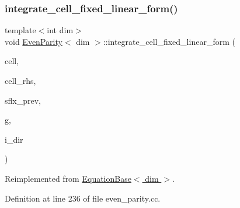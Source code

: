 \mbox{\label{class_even_parity_a5efaf943f1bde0b3f9a62ea8f5dc5ff0}} 
\subsubsection{\texorpdfstring{integrate\+\_\+cell\+\_\+fixed\+\_\+linear\+\_\+form()}{integrate\_cell\_fixed\_linear\_form()}}
{\footnotesize\ttfamily template$<$int dim$>$ \\
void \hyperlink{class_even_parity}{Even\+Parity}$<$ dim $>$\+::integrate\+\_\+cell\+\_\+fixed\+\_\+linear\+\_\+form (\begin{DoxyParamCaption}\item[{typename Do\+F\+Handler$<$ dim $>$\+::active\+\_\+cell\+\_\+iterator \&}]{cell,  }\item[{Vector$<$ double $>$ \&}]{cell\+\_\+rhs,  }\item[{std\+::vector$<$ Vector$<$ double $>$ $>$ \&}]{sflx\+\_\+prev,  }\item[{const unsigned int \&}]{g,  }\item[{const unsigned int \&}]{i\+\_\+dir }\end{DoxyParamCaption})\hspace{0.3cm}{\ttfamily [virtual]}}



Reimplemented from \hyperlink{class_equation_base_ae8472f5c20d76c7d01e5660f8377887e}{Equation\+Base$<$ dim $>$}.



Definition at line 236 of file even\+\_\+parity.\+cc.

\mbox{\label{class_even_parity_a0a6674c14f34f22c8ff383aee81ffabf}} 
